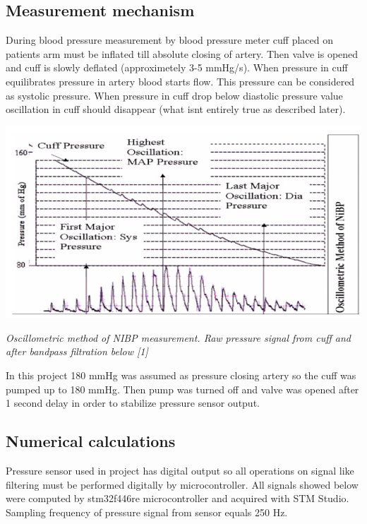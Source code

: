 \subsection*{Measurement mechanism}

During blood pressure measurement by blood pressure meter cuff placed on patient\textquotesingle{}s arm must be inflated till absolute closing of artery. Then valve is opened and cuff is slowly deflated (approximetely 3-\/5 mm\+Hg/s). When pressure in cuff equilibrates pressure in artery blood starts flow. This pressure can be considered as systolic pressure. When pressure in cuff drop below diastolic pressure value oscillation in cuff should disappear (what isn\textquotesingle{}t entirely true as described later). 
\begin{DoxyImage}
\includegraphics[width=\textwidth,height=\textheight/2,keepaspectratio=true]{OscillometricMethodOfNIBP.png}
\end{DoxyImage}
 {\itshape  Oscillometric method of N\+I\+BP measurement. Raw pressure signal from cuff and after bandpass filtration below \mbox{[}1\mbox{]} }~\newline


In this project 180 mm\+Hg was assumed as pressure closing artery so the cuff was pumped up to 180 mm\+Hg. Then pump was turned off and valve was opened after 1 second delay in order to stabilize pressure sensor output.

\subsection*{Numerical calculations}

Pressure sensor used in project has digital output so all operations on signal like filtering must be performed digitally by microcontroller. All signals showed below were computed by stm32f446re microcontroller and acquired with S\+TM Studio. Sampling frequency of pressure signal from sensor equals 250 Hz.

